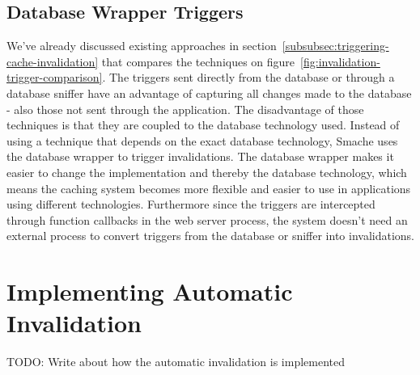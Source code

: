 
\subsection{Database Wrapper Triggers}
\label{subsec:database-wrapper-triggers}


We've already discussed existing approaches in section~\ref{subsubsec:triggering-cache-invalidation} that compares the techniques on figure~\ref{fig:invalidation-trigger-comparison}. The triggers sent directly from the database or through a database sniffer have an advantage of capturing all changes made to the database - also those not sent through the application. The disadvantage of those techniques is that they are coupled to the database technology used. Instead of using a technique that depends on the exact database technology, Smache uses the database wrapper to trigger invalidations. The database wrapper makes it easier to change the implementation and thereby the database technology, which means the caching system becomes more flexible and easier to use in applications using different technologies. Furthermore since the triggers are intercepted through function callbacks in the web server process, the system doesn't need an external process to convert triggers from the database or sniffer into invalidations.


\section{Implementing Automatic Invalidation}
\label{sec:implementing-automatic-invalidation}

TODO: Write about how the automatic invalidation is implemented


